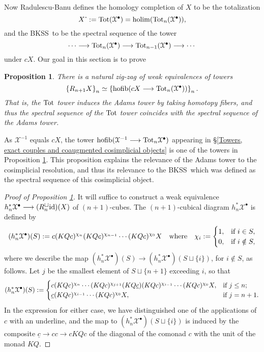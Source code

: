 \documentclass[11pt]{amsart} \renewcommand{\baselinestretch}{1.2}
\theoremstyle{plain}
\newtheorem{prop}[thm]{Proposition}
\numberwithin{equation}{section} %
\theoremstyle{plain}
\newtheorem{prop}[thm]{Proposition}
\numberwithin{equation}{chapter} %
\DeclareMathOperator*{\holim}{holim}
\DeclareMathOperator*{\hofib}{hofib}
\renewcommand{\to}{\longrightarrow}
\newcommand{\calx}{\mathcal{X}}
\newcommand{\Id}{\mathrm{id}}
\newcommand{\plainD}{R}
\newcommand{\BKSS}{BKSS}
\begin{document}
\begin{Bousfield-Kan spectral sequence}
Now Radulescu-Banu defines the homology completion of $X$ to be the totalization
\[X\hat{\ }:=\textup{Tot}(\calx^\bullet)=\holim (\textup{Tot}_n(\calx^\bullet)),\]
and the \BKSS\ to be the spectral sequence of the tower
\[\cdots \to\textup{Tot}_n(\calx^\bullet)\to \textup{Tot}_{n-1}(\calx^\bullet)\to\cdots \]
under $cX$. Our goal in this section is to prove
\begin{prop}
\label{towerIdentification}
There is a natural zig-zag of weak equivalences of towers \[\left\{\plainD_{n+1}X\right\}_n\simeq\left\{\hofib(cX\to\textup{Tot}_{n}(\calx^\bullet))\right\}_n.\] That is,  the $\textup{Tot}$ tower induces the Adams tower by taking homotopy fibers, and thus the spectral sequence of the $\textup{Tot}$ tower coincides with the spectral sequence of the Adams tower.
\end{prop}
\noindent As $\calx^{-1}$ equals $cX$, the tower $\hofib(\calx^{-1}\to\textup{Tot}_n\calx^{\bullet})$ appearing in \S\ref{Towers, exact couples and coaugmented cosimplicial objects} is one of the towers in Proposition \ref{towerIdentification}. This proposition explains the relevance of the Adams tower to the cosimplicial resolution, and thus its relevance to the \BKSS\ which was defined as the spectral sequence of this cosimplicial object.
\begin{proof}[Proof of Proposition \ref{towerIdentification}] 
It will suffice to construct a weak equivalence $h_n^*\calx^\bullet\to (\plainD_n^{\smash{\square}}\Id  )(X)$ of $(n+1)$-cubes. The $(n+1)$-cubical diagram $h_n^*\calx^\bullet$ is defined by
\[(h_n^*\calx^\bullet)(S):= c(KQc)^{\chi_{n}}(KQc)^{\chi_{n-1}}\cdots (KQc)^{\chi_0}X\quad \textup{where}\quad \chi_i:=\begin{cases}
1,&\textup{if }i\in S,\\
0,&\textup{if }i\notin S,
\end{cases}
\]
where we describe the map $(h_n^*\calx^\bullet)(S)\to (h_n^*\calx^\bullet)(S\sqcup\{i\})$, for $i\notin S$, as follows. Let $j$ be the smallest element of $S\sqcup\{n+1\}$ exceeding $i$, so that
\[(h_n^*\calx^\bullet)(S):= \begin{cases}
c(KQc)^{\chi_{n}}\cdots (KQc)^{\chi_{j+1}}(KQ\underline{c})(KQc)^{\chi_{i-1}}\cdots (KQc)^{\chi_0}X,&\textup{if }j\leq n;\\
\underline{c}(KQc)^{\chi_{i-1}}\cdots (KQc)^{\chi_0}X,&\textup{if }j=n+1.
\end{cases}
\]
In the expression for either case, we have distinguished one of the applications of $c$ with an underline, and the map to $(h_n^*\calx^\bullet)(S\sqcup\{i\})$ is induced by the composite $\underline{c}\to cc\to cKQc$ of the diagonal of the comonad $c$ with the unit of the monad $KQ$. 


\end{proof}
\end{Bousfield-Kan spectral sequence}
\end{document}
